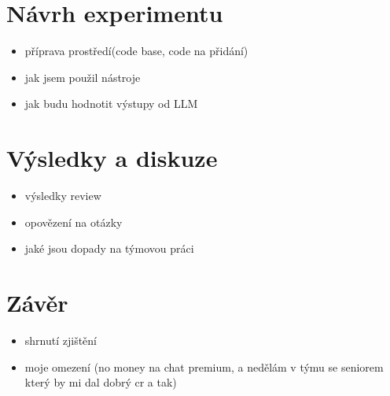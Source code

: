 \documentclass[12pt, a4paper]{article}
\begin{document}
\section{Návrh experimentu}
\begin{itemize}
  \item příprava prostředí(code base, code na přidání)
  \item jak jsem použil nástroje
  \item jak budu hodnotit výstupy od LLM
\end{itemize}

\section{Výsledky a diskuze}
\begin{itemize}
  \item výsledky review
  \item opovězení na otázky
  \item jaké jsou dopady na týmovou práci
\end{itemize}

\section{Závěr}
\begin{itemize}
  \item shrnutí zjištění
  \item moje omezení (no money na chat premium, a nedělám v týmu se seniorem který by mi dal dobrý cr a tak)
\end{itemize}

\end{document}
